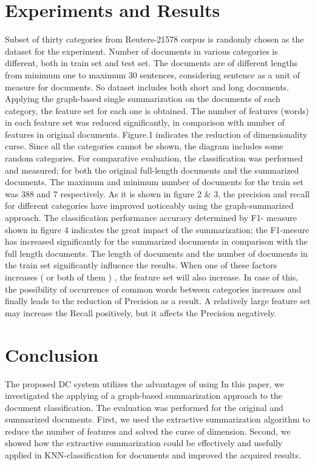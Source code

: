 \documentclass{sigchi}
\begin{document}
\section{Experiments and Results}\label{sectionExperiments}
Subset of thirty categories from Reuters-21578 corpus is
randomly chosen as the dataset for the experiment. Number of
documents in various categories is different, both in train set
and test set. The documents are of different lengths from
minimum one to maximum 30 sentences, considering sentence
as a unit of measure for documents. So dataset includes both
short and long documents.
Applying the graph-based single summarization on the
documents of each category, the feature set for each one is
obtained. The number of features (words) in each feature set
was reduced significantly, in comparison with number of
features in original documents. Figure.1 indicates the
reduction of dimensionality curse. Since all the categories
cannot be shown, the diagram includes some random
categories.
For comparative evaluation, the classification was
performed and measured; for both the original full-length
documents and the summarized documents. The maximum
and minimum number of documents for the train set was 388
and 7 respectively. As it is shown in figure 2 \& 3, the
precision and recall for different categories have improved
noticeably using the graph-summarized approach. The
classification performance accuracy determined by F1-
measure shown in figure 4 indicates the great impact of the
summarization; the F1-mesure has increased significantly for
the summarized documents in comparison with the full length
documents.
The length of documents and the number of documents in
the train set significantly influence the results. When one of
these factors increases ( or both of them ) , the feature set will
also increase. In case of this, the possibility of occurrence of
common words between categories increases and finally leads
to the reduction of Precision as a result. A relatively large
feature set may increase the Recall positively, but it affects the
Precision negatively.


\section{Conclusion}\label{sectionConclusion}
The proposed DC system utilizes the advantages of using
In this paper, we investigated the applying of a graph-based
summarization approach to the document classification. The
evaluation was performed for the original and summarized
documents. First, we used the extractive summarization
algorithm to reduce the number of features and solved the
curse of dimension. Second, we showed how the extractive
summarization could be effectively and usefully applied in
KNN-classification for documents and improved the acquired
results.
\end{document}
